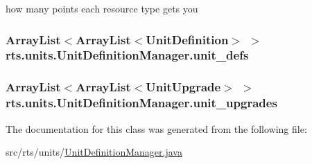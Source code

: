 \label{classrts_1_1units_1_1_unit_definition_manager_ad7ce99e932a21a2cf931496173b9a67e}
how many points each resource type gets you \hypertarget{classrts_1_1units_1_1_unit_definition_manager_a408e785a8b3cb7636aa8e6aeb14688af}{
\subsubsection[{unit\_\-defs}]{\setlength{\rightskip}{0pt plus 5cm}ArrayList$<$ArrayList$<${\bf UnitDefinition}$>$ $>$ {\bf rts.units.UnitDefinitionManager.unit\_\-defs}}}
\label{classrts_1_1units_1_1_unit_definition_manager_a408e785a8b3cb7636aa8e6aeb14688af}
\hypertarget{classrts_1_1units_1_1_unit_definition_manager_a9816c7d252a85c33bcd6a409657aa769}{
\subsubsection[{unit\_\-upgrades}]{\setlength{\rightskip}{0pt plus 5cm}ArrayList$<$ArrayList$<${\bf UnitUpgrade}$>$ $>$ {\bf rts.units.UnitDefinitionManager.unit\_\-upgrades}}}
\label{classrts_1_1units_1_1_unit_definition_manager_a9816c7d252a85c33bcd6a409657aa769}


The documentation for this class was generated from the following file:\begin{DoxyCompactItemize}
\item 
src/rts/units/\hyperlink{_unit_definition_manager_8java}{UnitDefinitionManager.java}\end{DoxyCompactItemize}
